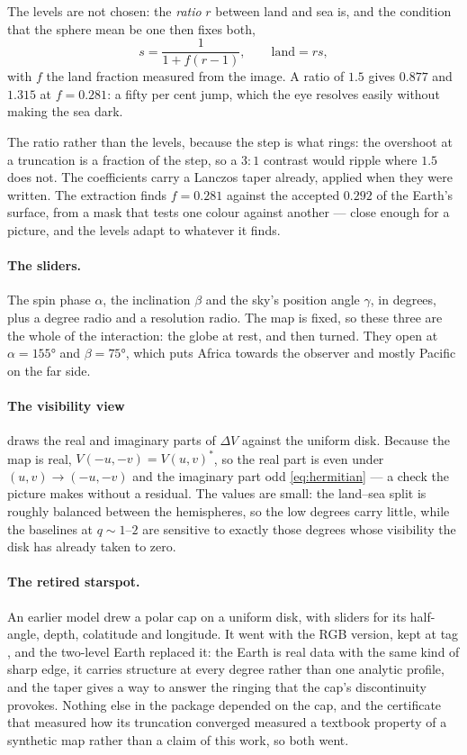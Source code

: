 The levels are not chosen: the \emph{ratio} $r$
between land and sea is, and the condition that the sphere mean be one then fixes both,
\begin{equation}
  s = \frac{1}{1 + f(r-1)}, \qquad \text{land} = rs ,
  \label{eq:levels}
\end{equation}
with $f$ the land fraction measured from the image.  A ratio of $1.5$ gives $0.877$ and
$1.315$ at $f = 0.281$: a fifty per cent jump, which the eye resolves easily without making
the sea dark.

The ratio rather than the levels, because the step is what rings: the overshoot at a
truncation is a fraction of the step, so a $3{:}1$ contrast would ripple where $1.5$ does not.
The coefficients carry a Lanczos taper already, applied when they were written.  The
extraction finds $f = 0.281$ against the accepted $0.292$ of the Earth's surface, from a mask
that tests one colour against another --- close enough for a picture, and the levels adapt to
whatever it finds.

\paragraph{The sliders.}  The spin phase $\alpha$, the inclination $\beta$ and the sky's
position angle $\gamma$, in degrees, plus a degree radio and a resolution radio.  The map is
fixed, so these three are the whole of the interaction: the globe at rest, and then turned.
They open at $\alpha = 155°$ and $\beta = 75°$, which puts Africa towards the observer and
mostly Pacific on the far side.

\paragraph{The visibility view} draws the real and imaginary parts of $\Delta V$ against the
uniform disk.  Because the map is real, $V(-u,-v) = V(u,v)^*$, so the real part is
even under $(u,v) \to (-u,-v)$ and the imaginary part odd \eqref{eq:hermitian} --- a check the
picture makes without a residual.  The values are small: the land--sea split is roughly
balanced between the hemispheres, so the low degrees carry little, while the baselines at
$q \sim 1$--$2$ are sensitive to exactly those degrees whose visibility the disk has already
taken to zero.

\paragraph{The retired starspot.}  An earlier model drew a polar cap on a uniform disk, with
sliders for its half-angle, depth, colatitude and longitude.  It went with the RGB version,
kept at tag , and the two-level Earth replaced it: the Earth is real data
with the same kind of sharp edge, it carries structure at every degree rather than one
analytic profile, and the taper gives a way to answer the ringing that the cap's discontinuity
provokes.  Nothing else in the package depended on the cap, and the certificate that measured
how its truncation converged measured a textbook property of a synthetic map rather than a
claim of this work, so both went.

